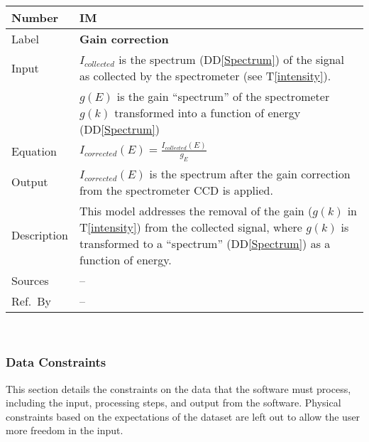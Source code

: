 \documentclass[12pt]{article}
\newcommand{\colAwidth}{0.13\textwidth}
\newcommand{\colBwidth}{0.82\textwidth}
\newcommand{\ddref}[1]{DD\ref{#1}}
\newcommand{\tref}[1]{T\ref{#1}}
\newcounter{instnum} %
\begin{document}
\noindent
\begin{minipage}{\textwidth}
	\renewcommand*{\arraystretch}{1.5}
	\begin{tabular}{| p{\colAwidth} | p{\colBwidth}|}
		\hline
		\rowcolor[gray]{0.9}
		Number& IM{instnum}\theinstnum \label{gain}\\
		\hline
		Label& \bf Gain correction\\
		\hline
		Input & $I_{collected}$ is the spectrum (\ddref{Spectrum}) of the signal as collected by the spectrometer (see \tref{intensity}).\\
		& $g(E)$ is the gain ``spectrum'' of the spectrometer $g(k)$ transformed into a function of energy (\ddref{Spectrum})\\
		\hline
		Equation & $I_{corrected}(E)=\frac{I_{collected}(E)}{g_{E}}$\\
		\hline
		Output& $I_{corrected}(E)$ is the spectrum after the gain correction from the spectrometer CCD is applied.\\
		\hline
		Description & This model addresses the removal of the gain ($g(k)$ in \tref{intensity}) from the collected signal, where $g(k)$ is transformed to a ``spectrum'' (\ddref{Spectrum}) as a function of energy.\\
		\hline
		Sources & --\\
		\hline
		Ref.\ By & --\\
		\hline
	\end{tabular}
\end{minipage}\\

\subsubsection{Data Constraints} \label{sec_DataConstraints}    
This section details the constraints on the data that the software must process, including the input, processing steps, and output from the software. Physical constraints based on the expectations of the dataset are left out to allow the user more freedom in the input.
\end{document}
